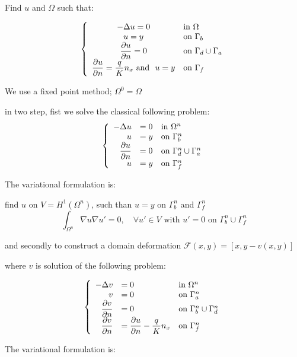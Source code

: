 \documentclass[a4paper,twoside,12pt]{book}
\def\p{\partial}
\begin{document}
Find $u$ and $\Omega$ such that:

 $$ \left\{\begin{array}{cl}
 \displaystyle - \Delta u = 0  & \mbox{in } \Omega\\
 \displaystyle      u = y         &\mbox{on } \Gamma_b \\
 \displaystyle      {\p u  \over \p n} = 0   &\mbox{on } \Gamma_d \cup \Gamma_a \\
 \displaystyle    {\p u  \over \p n} = { q\over K} n_x
          \mbox{\ and \ } {u = y}  &\mbox{on\ } \Gamma_ f
\end{array}\right. $$


We use a fixed point method;
$\Omega^0 = \Omega$

in two step, fist we solve the classical following problem:
$$ \left\{\begin{array}{rll}
 \displaystyle - \Delta u &= 0  & \mbox{in } \Omega^n\\
 \displaystyle      u &= y         &\mbox{on } \Gamma^n_b \\
 \displaystyle      {\p u  \over \p n} &= 0   &\mbox{on } \Gamma^n_d \cup \Gamma^n_a\\
 \displaystyle    u &= y        &\mbox{on\ } \Gamma^n_ f
\end{array}\right. $$

The variational formulation is:

find $u$ on $V=H^1(\Omega^n)$, such than  $u=y$ on $\Gamma^n_b$ and $\Gamma^n_f$
$$
 \int_{\Omega^n}  \nabla u \nabla u' = 0,  \quad \forall u' \in V  \mbox{ with }  u' =0 \mbox{ on }
\Gamma^n_b \cup \Gamma^n_f
$$


and secondly to construct a domain deformation $\mathcal{F}(x,y)=[x,y-v(x,y)]$

where $v$ is  solution of  the following problem:

 $$ \left\{\begin{array}{rll}
 \displaystyle - \Delta v &= 0  & \mbox{in } \Omega^n\\
 \displaystyle      v  &= 0         &\mbox{on } \Gamma^n_a \\
 \displaystyle      {\p v \over \p n} &= 0   &\mbox{on } \Gamma^n_b \cup \Gamma^n_d \\
 \displaystyle    {\p v  \over \p n}  &=  \displaystyle {\p u  \over \p n} - { q\over K} n_x
            &\mbox{on\ } \Gamma^n_ f
\end{array}\right. $$

The variational formulation is:
\end{document}
